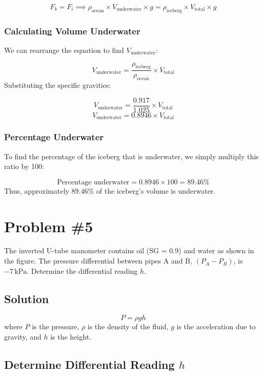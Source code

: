 \documentclass[12pt]{article}
\begin{document}
\[
F_b = F_i \implies \rho_{\text{ocean}} \times V_{\text{underwater}} \times g = \rho_{\text{iceberg}} \times V_{\text{total}} \times g
\]

\subsubsection*{Calculating Volume Underwater}
We can rearrange the equation to find \(V_{\text{underwater}}\):

\[
V_{\text{underwater}} = \frac{\rho_{\text{iceberg}}}{\rho_{\text{ocean}}} \times V_{\text{total}}
\]
Substituting the specific gravities:

\[
V_{\text{underwater}} = \frac{0.917}{1.025} \times V_{\text{total}}
\]
\[
V_{\text{underwater}} = 0.8946 \times V_{\text{total}}
\]

\subsubsection*{Percentage Underwater}
To find the percentage of the iceberg that is underwater, we simply multiply this ratio by 100:

\[
\text{Percentage underwater} = 0.8946 \times 100 = 89.46\%
\]
Thus, approximately \(89.46\%\) of the iceberg's volume is underwater.

\newpage
\section*{Problem \#5}
The inverted U-tube manometer contains oil (SG = 0.9) and water as shown in the figure. The pressure differential between pipes A and B, \( (P_A - P_B) \), is \(-7 \, \text{kPa}\). Determine the differential reading \( h \).

\subsection*{Solution}
\begin{equation}
P = \rho g h
\end{equation}
where \( P \) is the pressure, \( \rho \) is the density of the fluid, \( g \) is the acceleration due to gravity, and \( h \) is the height.

\subsection*{Determine Differential Reading \( h \)}
\end{document}
